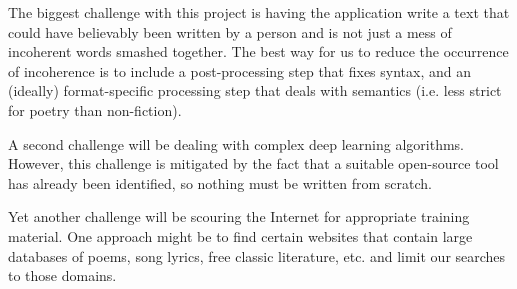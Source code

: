 \documentclass[12pt]{article}
\begin{document}
The biggest challenge with this project is having the application write a text that could have believably been written by a person and is not just a mess of incoherent words smashed together. The best way for us to reduce the occurrence of incoherence is to include a post-processing step that fixes syntax, and an (ideally) format-specific processing step that deals with semantics (i.e. less strict for poetry than non-fiction).

A second challenge will be dealing with complex deep learning algorithms. However, this challenge is mitigated by the fact that a suitable open-source tool has already been identified, so nothing must be written from scratch.

Yet another challenge will be scouring the Internet for appropriate training material. One approach might be to find certain websites that contain large databases of poems, song lyrics, free classic literature, etc. and limit our searches to those domains.



\end{document}
